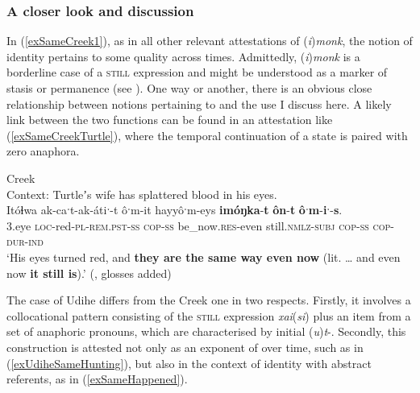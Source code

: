 \subsubsection{A closer look and discussion} 
In (\ref{exSameCreek1}), as in all other relevant attestations of \mbox{(\textit{i})\textit{monk}}, the notion of identity pertains to some quality across times. Admittedly, \mbox{(\textit{i})\textit{monk}} is a borderline case of a \textsc{still} expression and might be understood as a marker of stasis or permanence (see ). One way or another, there is an obvious close relationship between notions pertaining to  and the use I discuss here. A likely link between the two functions can be found in an attestation like (\ref{exSameCreekTurtle}), where the temporal continuation of a state is paired with zero anaphora. 

\begin{exe}
	\ex Creek\\
	 Context: Turtleʼs wife has splattered blood in his eyes.\label{exSameCreekTurtle}\\
	\gll Itóɬwa 	ak-caˑt-ak-átiˑ-t ôˑm-it hayyôˑm-eys \textbf{imóŋka}-\textbf{t} \textbf{ôn}-\textbf{t} \textbf{ôˑm}-\textbf{iˑ}-\textbf{s}.\\
3.eye \textsc{loc}-red-\textsc{pl}-\textsc{rem}.\textsc{pst}-\textsc{ss} \textsc{cop}-\textsc{ss} be\_now.\textsc{res}-even still.\textsc{nmlz}-\textsc{subj} \textsc{cop}-\textsc{ss} \textsc{cop}-\textsc{dur}-\textsc{ind}\\
	\glt \lq His eyes turned red, and \textbf{they are the same way even now} (lit. … and even now \textbf{it still is}).\rq{ }(\cite[442]{HaasHill2014}, glosses added)
\end{exe}

The case of Udihe differs from the Creek one in two respects. Firstly, it involves a collocational pattern consisting of the \textsc{still} expression \mbox{\textit{xai}(\textit{si})} plus an item from a set of anaphoric pronouns, which are characterised by initial \mbox{(\textit{u})\textit{t}-}. Secondly, this construction is attested not only as an exponent of  over time, such as in (\ref{exUdiheSameHunting}), but also in the context of identity with abstract referents, as in (\ref{exSameHappened}).


